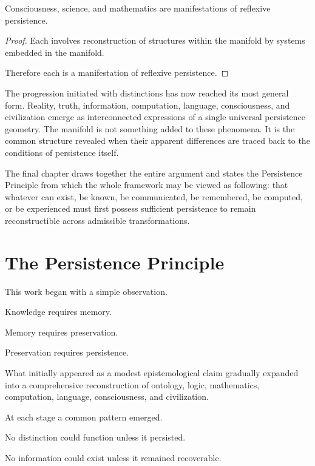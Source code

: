 \documentclass[12pt,oneside]{article}
\theoremstyle{definition}
\begin{document}
\begin{corollary}

Consciousness, science, and mathematics are manifestations of reflexive persistence.

\end{corollary}

\begin{proof}

Each involves reconstruction of structures within the manifold by systems embedded in the manifold.

Therefore each is a manifestation of reflexive persistence.

\end{proof}

The progression initiated with distinctions has now reached its most general form. Reality, truth, information, computation, language, consciousness, and civilization emerge as interconnected expressions of a single universal persistence geometry. The manifold is not something added to these phenomena. It is the common structure revealed when their apparent differences are traced back to the conditions of persistence itself.

The final chapter draws together the entire argument and states the Persistence Principle from which the whole framework may be viewed as following: that whatever can exist, be known, be communicated, be remembered, be computed, or be experienced must first possess sufficient persistence to remain reconstructible across admissible transformations.

\section{The Persistence Principle}

This work began with a simple observation.

Knowledge requires memory.

Memory requires preservation.

Preservation requires persistence.

What initially appeared as a modest epistemological claim gradually expanded into a comprehensive reconstruction of ontology, logic, mathematics, computation, language, consciousness, and civilization.

At each stage a common pattern emerged.

No distinction could function unless it persisted.

No information could exist unless it remained recoverable.
\end{document}
